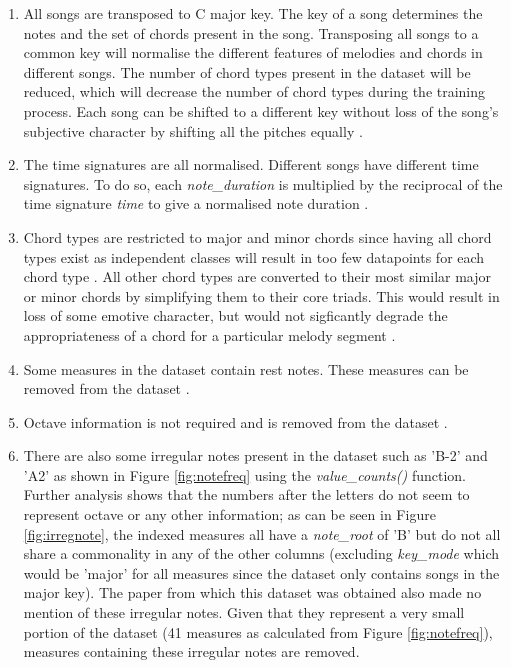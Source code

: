 \begin{enumerate}
  \item All songs are transposed to C major key. The key of a song determines the notes and the set of chords present in the song. Transposing all songs to a common key will normalise the different features of melodies and chords in different songs. The number of chord types present in the dataset will be reduced, which will decrease the number of chord types during the training process. Each song can be shifted to a different key without loss of the song's subjective character by shifting all the pitches equally \cite{MySong} \cite{MLForChords} \cite{BLSTM}.
  \item The time signatures are all normalised. Different songs have different time signatures. To do so, each \emph{note\_duration} is multiplied by the reciprocal of the time signature \emph{time} to give a normalised note duration \cite{BLSTM}.
  \item Chord types are restricted to major and minor chords since having all chord types exist as independent classes will result in too few datapoints for each chord type \cite{BLSTM}. All other chord types are converted to their most similar major or minor chords by simplifying them to their core triads. This would result in loss of some emotive character, but would not sigficantly degrade the appropriateness of a chord for a particular melody segment \cite{MySong}.
  \item Some measures in the dataset contain rest notes. These measures can be removed from the dataset \cite{MLForChords}.
  \item Octave information is not required and is removed from the dataset \cite{BLSTM}.
  \item There are also some irregular notes present in the dataset such as 'B-2' and 'A2' as shown in Figure \ref{fig:notefreq} using the \emph{value\_counts()} function. Further analysis shows that the numbers after the letters do not seem to represent octave or any other information; as can be seen in Figure \ref{fig:irregnote}, the indexed measures all have a \emph{note\_root} of 'B' but do not all share a commonality in any of the other columns (excluding \emph{key\_mode} which would be 'major' for all measures since the dataset only contains songs in the major key). The paper from which this dataset was obtained also made no mention of these irregular notes. Given that they represent a very small portion of the dataset (41 measures as calculated from Figure \ref{fig:notefreq}), measures containing these irregular notes are removed.
\end{enumerate}

